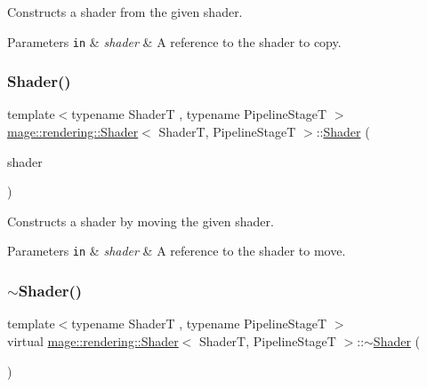 Constructs a shader from the given shader.


\begin{DoxyParams}[1]{Parameters}
\mbox{\tt in}  & {\em shader} & A reference to the shader to copy. \\
\hline
\end{DoxyParams}
\hypertarget{classmage_1_1rendering_1_1_shader_a65ecc5e4958ce06d7dfa8632dccc774f}{}\label{classmage_1_1rendering_1_1_shader_a65ecc5e4958ce06d7dfa8632dccc774f} 
\subsubsection{\texorpdfstring{Shader()}{Shader()}\hspace{0.1cm}{\footnotesize\ttfamily [3/3]}}
{\footnotesize\ttfamily template$<$typename ShaderT , typename Pipeline\+StageT $>$ \\
\hyperlink{classmage_1_1rendering_1_1_shader}{mage\+::rendering\+::\+Shader}$<$ ShaderT, Pipeline\+StageT $>$\+::\hyperlink{classmage_1_1rendering_1_1_shader}{Shader} (\begin{DoxyParamCaption}\item[{\hyperlink{classmage_1_1rendering_1_1_shader}{Shader}$<$ ShaderT, Pipeline\+StageT $>$ \&\&}]{shader }\end{DoxyParamCaption})\hspace{0.3cm}{\ttfamily [noexcept]}}

Constructs a shader by moving the given shader.


\begin{DoxyParams}[1]{Parameters}
\mbox{\tt in}  & {\em shader} & A reference to the shader to move. \\
\hline
\end{DoxyParams}
\hypertarget{classmage_1_1rendering_1_1_shader_af9774a6a1f073f0477c5f4e35f130181}{}\label{classmage_1_1rendering_1_1_shader_af9774a6a1f073f0477c5f4e35f130181} 
\subsubsection{\texorpdfstring{$\sim$\+Shader()}{~Shader()}}
{\footnotesize\ttfamily template$<$typename ShaderT , typename Pipeline\+StageT $>$ \\
virtual \hyperlink{classmage_1_1rendering_1_1_shader}{mage\+::rendering\+::\+Shader}$<$ ShaderT, Pipeline\+StageT $>$\+::$\sim$\hyperlink{classmage_1_1rendering_1_1_shader}{Shader} (\begin{DoxyParamCaption}{ }\end{DoxyParamCaption})\hspace{0.3cm}{\ttfamily [virtual]}}

